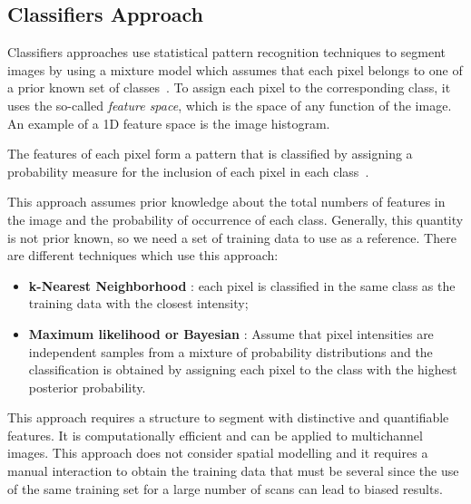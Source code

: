 \documentclass{standalone}
\begin{document}
\subsection{Classifiers Approach}

	Classifiers approaches use statistical pattern recognition techniques to segment images by using a mixture model which assumes that each pixel belongs to one of a prior known set of classes~\cite{INP:Withey}. To assign each pixel to the corresponding class, it uses the so-called \emph{feature space}, which is the space of any function of the image. An example of a 1D feature space is the image histogram. 

	The features of each pixel form a pattern that is classified by assigning a probability measure for the inclusion of each pixel in each class~\cite{INP:Withey}.

	This approach assumes prior knowledge about the total numbers of features in the image and the probability of occurrence of each class. Generally, this quantity is not prior known, so we need a set of training data to use as a reference. There are different techniques which use this approach: 

	\begin{itemize}

	\item \textbf{k-Nearest Neighborhood} : each pixel is classified in the same class as the training data with the closest intensity; 

	\item \textbf{Maximum likelihood or Bayesian} : Assume that pixel intensities are independent samples from a mixture of probability distributions and the  classification is obtained by assigning each pixel to the class with the highest posterior probability. 
	\end{itemize}

	This approach requires a structure to segment with distinctive and quantifiable features. It is computationally efficient and can be applied to multichannel images. 
	This approach does not consider spatial modelling and it requires a manual interaction to obtain the training data that must be several since the use of the same training set for a large number of scans can lead to biased results.  
\end{document}

